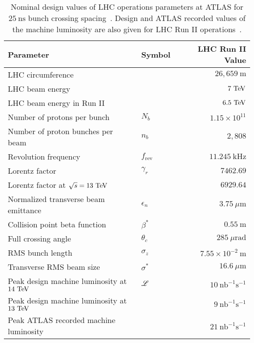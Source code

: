 \begin{table}[htpb]
 \centering
 \caption[Nominal design values of LHC operations parameters at ATLAS for $25~\textrm{ns}$ bunch crossing spacing]{%
  Nominal design values of LHC operations parameters at ATLAS for $25~\textrm{ns}$ bunch crossing spacing~\cite{Evans:2008,PhysRevAccelBeams.19.101003}.
  Design and ATLAS recorded values of the machine luminosity are also given for LHC Run II operations~\cite{TWiki:2018ATLASPeakLumi}.
 }
 \begin{tabular}{@{}llr@{}} \toprule
  Parameter                                   & Symbol             & LHC Run II Value                     \\ \midrule
  LHC circumference                           &                    & $26,659~\mathrm{m}$                  \\
  LHC beam energy                             &                    & $7~\mathrm{TeV}$                             \\
  LHC beam energy in Run II                   &                    & $6.5~\mathrm{TeV}$                           \\
  Number of protons per bunch                 & $N_{b}$            & $1.15 \times 10^{11}$                \\
  Number of proton bunches per beam           & $n_{b}$            & $2,808$                              \\
  Revolution frequency                        & $f_{\textrm{rev}}$ & $11.245~\mathrm{kHz}$                \\
  Lorentz factor                              & $\gamma_{r}$       & $7462.69$                            \\
  Lorentz factor at $\sqrt{s} = 13~\mathrm{TeV}$      &                    & $6929.64$                            \\
  Normalized transverse beam emittance        & $\epsilon_{n}$     & $3.75~\mu\mathrm{m}$                 \\
  Collision point beta function               & $\beta^{*}$        & $0.55~\mathrm{m}$                    \\
  Full crossing angle                         & $\theta_{c}$       & $285~\mu\mathrm{rad}$                \\
  RMS bunch length                            & $\sigma_{z}$       & $7.55\times 10^{-2}~\mathrm{m}$      \\
  Transverse RMS beam size                    & $\sigma^{*}$       & $16.6~\mu\mathrm{m}$                 \\ \midrule
  Peak design machine luminosity at $14~\mathrm{TeV}$ & $\mathscr{L}$      & $10~\mathrm{nb}^{-1}\mathrm{s}^{-1}$ \\
  Peak design machine luminosity at $13~\mathrm{TeV}$ &                    & $9~\mathrm{nb}^{-1}\mathrm{s}^{-1}$  \\
  Peak ATLAS recorded machine luminosity      &                    & $21~\mathrm{nb}^{-1}\mathrm{s}^{-1}$ \\
  \bottomrule
 \end{tabular}\label{table:LHC_collider_parameters}%
\end{table}
